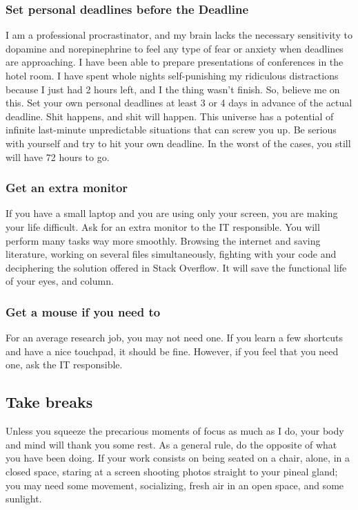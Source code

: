 \documentclass{article}
\begin{document}
\subsubsection{Set personal deadlines before the Deadline}
\label{subsubsec: deadlines}
I am a professional procrastinator, and my brain lacks the necessary sensitivity to dopamine and norepinephrine to feel any type of fear or anxiety when deadlines are approaching. I have been able to prepare presentations of conferences in the hotel room. I have spent whole nights self-punishing my ridiculous distractions because I just had 2 hours left, and I the thing wasn't finish. So, believe me on this. Set your own personal deadlines at least 3 or 4 days in advance of the actual deadline. Shit happens, and shit will happen. This universe has a potential of infinite last-minute unpredictable situations that can screw you up. Be serious with yourself and try to hit your own deadline. In the worst of the cases, you still will have 72 hours to go. 
\subsubsection{Get an extra monitor}
\label{subsubsec: monitor}
If you have a small laptop and you are using only your screen, you are making your life difficult. Ask for an extra monitor to the IT responsible. You will perform many tasks way more smoothly. Browsing the internet and saving literature, working on several files simultaneously, fighting with your code and deciphering the solution offered in Stack Overflow. It will save the functional life of your eyes, and column.
\subsubsection{Get a mouse if you need to}
\label{subsubsec: mouse}
For an average research job, you may not need one. If you learn a few shortcuts and have a nice touchpad, it should be fine. However, if you feel that you need one, ask the IT responsible.
\subsection{Take breaks}
\label{subsec: breaks}
Unless you squeeze the precarious moments of focus as much as I do, your body and mind will thank you some rest.  As a general rule, do the opposite of what you have been doing. If your work consists on being seated on a chair, alone, in a closed space, staring at a screen shooting photos straight to your pineal gland; you may need some movement, socializing, fresh air in an open space, and some sunlight. 
\end{document}

